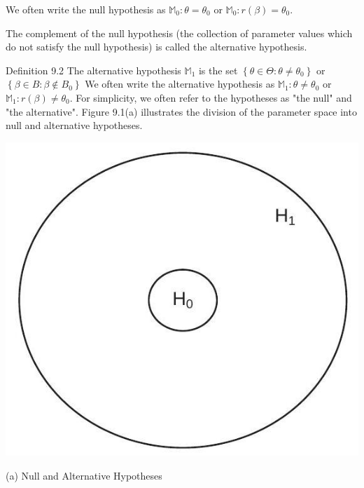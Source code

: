 \documentclass[10pt]{article}
\begin{document}
We often write the null hypothesis as $\mathbb{M}_{0}: \theta=\theta_{0}$ or $\mathbb{M}_{0}: r(\beta)=\theta_{0}$.

The complement of the null hypothesis (the collection of parameter values which do not satisfy the null hypothesis) is called the alternative hypothesis.

Definition 9.2 The alternative hypothesis $\mathbb{M}_{1}$ is the set $\left\{\theta \in \Theta: \theta \neq \theta_{0}\right\}$ or $\left\{\beta \in B: \beta \notin B_{0}\right\}$ We often write the alternative hypothesis as $\mathbb{M}_{1}: \theta \neq \theta_{0}$ or $\mathbb{M}_{1}: r(\beta) \neq \theta_{0}$. For simplicity, we often refer to the hypotheses as "the null" and "the alternative". Figure 9.1(a) illustrates the division of the parameter space into null and alternative hypotheses.

\includegraphics[max width=\textwidth]{2022_09_17_d22774979aa7978900adg-02}

(a) Null and Alternative Hypotheses
\end{document}
